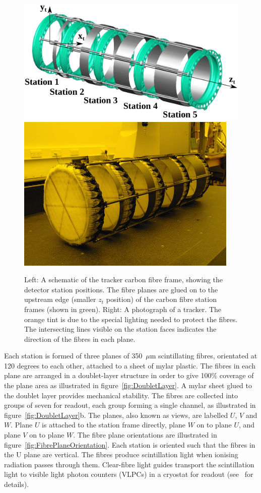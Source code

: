   \begin{figure}[tbh]
    \centering
    \includegraphics[width=0.5\linewidth]{01-MICE/TrackerFrame.pdf} \hspace{2pc}%
    \includegraphics[width=0.35\linewidth]{01-MICE/TrackerPhoto.pdf}
    \caption{\label{fig:Trackers} Left: A schematic of the tracker carbon fibre frame, showing the detector station positions.  The fibre planes are glued on to the upstream edge (smaller $z_t$ position) of the carbon fibre station frames (shown in green). Right: A photograph of a tracker. The orange tint is due to the special lighting needed to protect the fibres. The intersecting lines visible on the station faces indicates the direction of the fibres in each plane.}
  \end{figure}

  Each station is formed of three planes of 350~$\mu$m scintillating fibres, orientated at 120 degrees to each other, attached to a sheet of mylar plastic. The fibres in each plane are arranged in a doublet-layer structure in order to give 100$\%$ coverage of the plane area as illustrated in figure~\ref{fig:DoubletLayer}. A mylar sheet glued to the doublet layer provides mechanical stability. The fibres are collected into groups of seven for readout, each group forming a single channel, as illustrated in figure~\ref{fig:DoubletLayer}b. The planes, also known as views, are labelled $U$, $V$ and $W$. Plane $U$ is attached to the station frame directly, plane $W$ on to plane $U$, and plane $V$ on to plane $W$. The fibre plane orientations are illustrated in figure~\ref{fig:FibrePlaneOrientation}. Each station is oriented such that the fibres in the U plane are vertical. The fibres produce scintillation light when ionising radiation passes through them. Clear-fibre light guides transport the scintillation light to visible light photon counters (VLPCs) in a cryostat for readout (see~\cite{MiceTrackers} for details).

